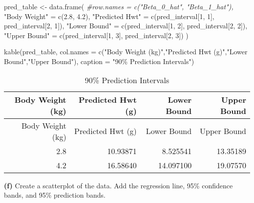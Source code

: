 \documentclass[
]{article}
\newenvironment{Shaded}{\begin{snugshade}}{\end{snugshade}}
\newcommand{\AttributeTok}[1]{\textcolor[rgb]{0.77,0.63,0.00}{#1}}
\newcommand{\CommentTok}[1]{\textcolor[rgb]{0.56,0.35,0.01}{\textit{#1}}}
\newcommand{\DecValTok}[1]{\textcolor[rgb]{0.00,0.00,0.81}{#1}}
\newcommand{\FloatTok}[1]{\textcolor[rgb]{0.00,0.00,0.81}{#1}}
\newcommand{\FunctionTok}[1]{\textcolor[rgb]{0.00,0.00,0.00}{#1}}
\newcommand{\NormalTok}[1]{#1}
\newcommand{\OtherTok}[1]{\textcolor[rgb]{0.56,0.35,0.01}{#1}}
\newcommand{\StringTok}[1]{\textcolor[rgb]{0.31,0.60,0.02}{#1}}
\begin{document}
\begin{Shaded}
\begin{Highlighting}[]
\NormalTok{pred\_table }\OtherTok{\textless{}{-}} \FunctionTok{data.frame}\NormalTok{(}
  \CommentTok{\#row.names = c("Beta\_0\_hat", "Beta\_1\_hat"),}
  \StringTok{"Body Weight"} \OtherTok{=} \FunctionTok{c}\NormalTok{(}\FloatTok{2.8}\NormalTok{,}
                  \FloatTok{4.2}\NormalTok{),}
  \StringTok{"Predicted Hwt"} \OtherTok{=} \FunctionTok{c}\NormalTok{(pred\_interval[}\DecValTok{1}\NormalTok{, }\DecValTok{1}\NormalTok{],}
\NormalTok{                  pred\_interval[}\DecValTok{2}\NormalTok{, }\DecValTok{1}\NormalTok{]),}
  \StringTok{"Lower Bound"} \OtherTok{=} \FunctionTok{c}\NormalTok{(pred\_interval[}\DecValTok{1}\NormalTok{, }\DecValTok{2}\NormalTok{],}
\NormalTok{                  pred\_interval[}\DecValTok{2}\NormalTok{, }\DecValTok{2}\NormalTok{]), }
  \StringTok{"Upper Bound"} \OtherTok{=} \FunctionTok{c}\NormalTok{(pred\_interval[}\DecValTok{1}\NormalTok{, }\DecValTok{3}\NormalTok{],}
\NormalTok{                  pred\_interval[}\DecValTok{2}\NormalTok{, }\DecValTok{3}\NormalTok{])   }
\NormalTok{)}

\FunctionTok{kable}\NormalTok{(pred\_table, }
      \AttributeTok{col.names =} \FunctionTok{c}\NormalTok{(}\StringTok{"Body Weight (kg)"}\NormalTok{,}\StringTok{"Predicted Hwt (g)"}\NormalTok{,}\StringTok{"Lower Bound"}\NormalTok{,}\StringTok{"Upper Bound"}\NormalTok{),}
      \AttributeTok{caption =} \StringTok{"90\% Prediction Intervals"}\NormalTok{)}
\end{Highlighting}
\end{Shaded}

\begin{longtable}[]{@{}rrrr@{}}
\caption{90\% Prediction Intervals}\tabularnewline
\toprule
Body Weight (kg) & Predicted Hwt (g) & Lower Bound & Upper Bound \\
\midrule
\endfirsthead
\toprule
Body Weight (kg) & Predicted Hwt (g) & Lower Bound & Upper Bound \\
\midrule
\endhead
2.8 & 10.93871 & 8.525541 & 13.35189 \\
4.2 & 16.58640 & 14.097100 & 19.07570 \\
\bottomrule
\end{longtable}

\textbf{(f)} Create a scatterplot of the data. Add the regression line,
95\% confidence bands, and 95\% prediction bands.
\end{document}
